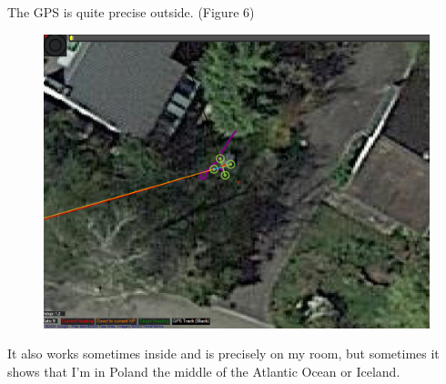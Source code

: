 \documentclass{article}
\begin{document}
\pagebreak %
	The GPS is quite precise outside. (Figure 6)
	
\begin{figure}[h]
	\centering
	\includegraphics[scale=0.2]{pictures/GPS_Outside}
	\caption{}
	\label{fig:gpsoutside}
\end{figure}
	
	It also works sometimes inside and is precisely on my room, but sometimes it shows that I'm in Poland the middle of the Atlantic Ocean or Iceland.
\end{document}
